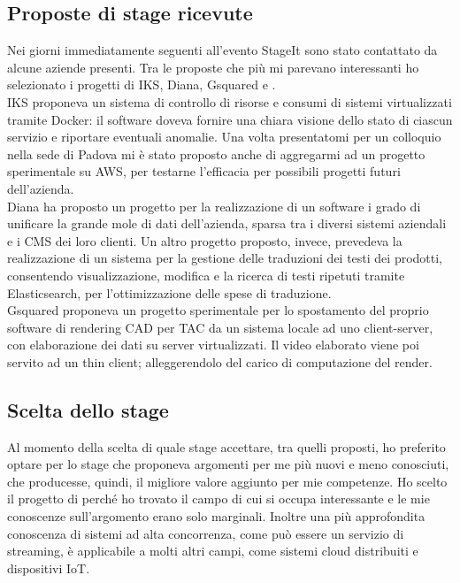    \subsection{Proposte di stage ricevute}
   Nei giorni immediatamente seguenti all'evento StageIt sono stato contattato da alcune aziende presenti. Tra le proposte che più mi parevano interessanti ho selezionato i progetti di IKS, Diana, Gsquared e \nomeAzienda{}.
   \\
   IKS proponeva un sistema di controllo di risorse e consumi di sistemi virtualizzati tramite \gls{Docker}: il software doveva fornire una chiara visione dello stato di ciascun servizio e riportare eventuali anomalie. Una volta presentatomi per un colloquio nella sede di Padova mi è stato proposto anche di aggregarmi ad un progetto sperimentale su \gls{AWS}, per testarne l'efficacia per possibili progetti futuri dell'azienda.
   \\
   Diana ha proposto un progetto per la realizzazione di un software i grado di unificare la grande mole di dati dell'azienda, sparsa tra i diversi sistemi aziendali e i \gls{CMS} dei loro clienti. Un altro progetto proposto, invece, prevedeva la realizzazione di un sistema per la gestione delle traduzioni dei testi dei prodotti, consentendo visualizzazione, modifica e la ricerca di testi ripetuti tramite Elasticsearch, per l'ottimizzazione delle spese di traduzione.
   \\
   Gsquared proponeva un progetto sperimentale per lo spostamento del proprio software di rendering \gls{CAD} per \gls{TAC} da un sistema locale ad uno client-server, con elaborazione dei dati su server virtualizzati. Il video elaborato viene poi servito ad un \gls{thin client}; alleggerendolo del carico di computazione del render.
   
   \subsection{Scelta dello stage}
   Al momento della scelta di quale stage accettare, tra quelli proposti, ho preferito optare per lo stage che proponeva argomenti per me più nuovi e meno conosciuti, che producesse, quindi, il migliore valore aggiunto per mie competenze.
   Ho scelto il progetto di \nomeAzienda{} perché ho trovato il campo di cui si occupa interessante e le mie conoscenze sull'argomento erano solo marginali. Inoltre una più approfondita conoscenza di sistemi ad alta concorrenza, come può essere un servizio di streaming, è applicabile a molti altri campi, come sistemi cloud distribuiti e dispositivi IoT.

